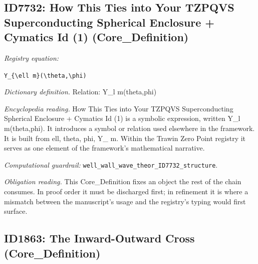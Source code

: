 \documentclass[11pt]{article}
\theoremstyle{remark}
\begin{document}
\subsection{ID7732: How This Ties into Your TZPQVS Superconducting Spherical Enclosure + Cymatics Id (1) (Core\_Definition)}

\noindent\textit{Registry equation:}\par
{\small\texttt{Y\_\{\textbackslash{}ell m\}(\textbackslash{}theta,\textbackslash{}phi)}}\par\medskip
\noindent\textit{Dictionary definition.} Relation: Y\_l m(theta,phi)\par\medskip
\noindent\textit{Encyclopedia reading.} How This Ties into Your TZPQVS Superconducting Spherical Enclosure + Cymatics Id (1) is a symbolic expression, written Y\_l m(theta,phi). It introduces a symbol or relation used elsewhere in the framework. It is built from ell, theta, phi, Y\_ m. Within the Trawin Zero Point registry it serves as one element of the framework's mathematical narrative.
\par\medskip\noindent\textit{Computational guardrail:} \texttt{well\_wall\_wave\_theor\_ID7732\_structure}.
\par\medskip\noindent\textit{Obligation reading.} This Core\_Definition fixes an object the rest of the chain consumes. In proof order it must be discharged first; in refinement it is where a mismatch between the manuscript's usage and the registry's typing would first surface.

\subsection{ID1863: The Inward-Outward Cross (Core\_Definition)}
\end{document}
